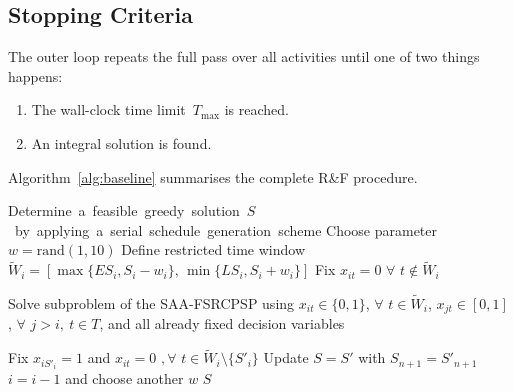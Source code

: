 \subsection{Stopping Criteria}
\label{subsec:stopping}
The outer loop repeats the full pass over all activities until one
of two things happens:
\begin{enumerate}
    \item The wall-clock time limit~$T_{\max}$ is reached.
    \item An integral solution is found.
\end{enumerate}
Algorithm~\ref{alg:baseline} summarises the complete R\&F
procedure.
\begin{algorithm}[ht]
\caption{Procedure of the proposed activity-oriented F\&R}
\label{alg:baseline}
\begin{algorithmic}[1]
\State \mbox{Determine a feasible greedy solution $S$ by applying a serial schedule generation scheme}
        \State Choose parameter $w = \mathrm{rand}(1,10)$
        \State Define restricted time window $\widetilde{W}_i = [\max\{ES_i,S_i-w_i\},\,\min\{LS_i,S_i+w_i\}]$
        \State Fix $x_{it}= 0$ $\forall$ $t \notin \widetilde{W}_i$
        \State \parbox[t]{\dimexpr\linewidth-\algorithmicindent\relax}{%
        Solve subproblem of the SAA-FSRCPSP using $x_{it}\in\{0,1\}$, $\forall$ $t\in\widetilde{W}_i$, $x_{jt}\in[0,1]$, $\forall$ $j>i,\ t\in T$, and all already fixed decision variables%
}
            \State Fix $x_{iS'_i} = 1$ and $x_{it} = 0$ $, \forall$ $t\in\widetilde{W}_i\setminus\{S'_i\}$
                \State Update $S = S'$ with $S_{n+1} = S'_{n+1}$
            \EndIf
        \Else
            \State $i = i-1$ and choose another $w$
        \EndIf
    \EndFor
\EndWhile
\State \Return $S$
\end{algorithmic}
\end{algorithm}
